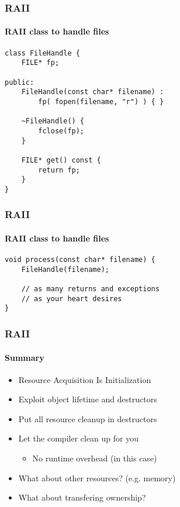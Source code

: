 \begin{frame}[fragile]
    \frametitle{RAII}
    \framesubtitle{RAII class to handle files}
    \begin{lstlisting}[title=Problems begone!]
class FileHandle {
    FILE* fp;

public:
    FileHandle(const char* filename) :
        fp( fopen(filename, "r") ) { }

    ~FileHandle() {
        fclose(fp);
    }

    FILE* get() const {
        return fp;
    }
}
    \end{lstlisting}
\end{frame}

\begin{frame}[fragile]
    \frametitle{RAII}
    \framesubtitle{RAII class to handle files}
    \begin{lstlisting}[title=Problems begone!]
void process(const char* filename) {
    FileHandle(filename);

    // as many returns and exceptions
    // as your heart desires
}
    \end{lstlisting}
\end{frame}

\begin{frame}
    \frametitle{RAII}
    \framesubtitle{Summary}
    \begin{itemize}
        \item<1->Resource Acquisition Is Initialization 
        \item<1->Exploit object lifetime and destructors
        \item<1->Put all resource cleanup in destructors
        \item<1->Let the compiler clean up for you
            \begin{itemize}
                \item No runtime overhead (in this case)
            \end{itemize}
        \item<2->What about other resources? (e.g. memory)
        \item<2->What about transfering ownership?
    \end{itemize}
\end{frame}


